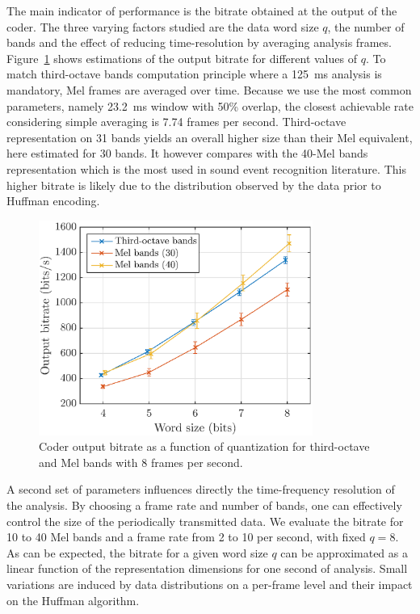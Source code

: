 \documentclass[sensors,article,submit,moreauthors,pdftex,10pt,a4paper]{mdpi}
\begin{document}
The main indicator of performance is the bitrate obtained at the output of the coder. The three varying factors studied are the data word size $q$, the number of bands and the effect of reducing time-resolution by averaging analysis frames. Figure~\ref{fig:bitrate_q} shows estimations of the output bitrate for different values of $q$. To match third-octave bands computation principle where a 125~ms analysis is mandatory, Mel frames are averaged over time. Because we use the most common parameters, namely 23.2~ms window with 50\% overlap, the closest achievable rate considering simple averaging is 7.74 frames per second. Third-octave representation on 31 bands yields an overall higher size than their Mel equivalent, here estimated for 30 bands. It however compares with the 40-Mel bands representation which is the most used in sound event recognition literature. This higher bitrate is likely due to the distribution observed by the data prior to Huffman encoding.

\begin{figure}[htbp]
	\centering
		\includegraphics[width=0.8\textwidth]{figures/bitrate_qall.eps}
	\caption{Coder output bitrate as a function of quantization for third-octave and Mel bands with 8 frames per second.}
	\label{fig:bitrate_q}
\end{figure}

A second set of parameters influences directly the time-frequency resolution of the analysis. By choosing a frame rate and number of bands, one can effectively control the size of the periodically transmitted data. We evaluate the bitrate for 10 to 40 Mel bands and a frame rate from 2 to 10 per second, with fixed $q = 8$. As can be expected, the bitrate for a given word size $q$ can be approximated as a linear function of the representation dimensions for one second of analysis. Small variations are induced by data distributions on a per-frame level and their impact on the Huffman algorithm.
\end{document}
